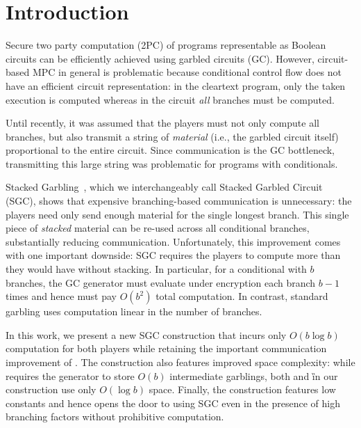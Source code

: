 \section{Introduction}\label{sec:intro}

Secure two party computation (2PC) of programs representable as Boolean circuits can be efficiently achieved using garbled circuits (GC).
%
However,  circuit-based MPC in general is problematic because conditional
control flow does not have an efficient circuit representation:
in the cleartext program, only the taken execution is computed whereas in
the circuit \emph{all} branches must be computed.

%
Until recently, it was assumed that the players must not only compute
all branches, but also transmit a string of \emph{material} (i.e., the garbled circuit itself) 
proportional to the entire circuit.  
Since communication is the GC bottleneck, transmitting this large string was
problematic for programs with conditionals.

Stacked Garbling~\HK, which we %
interchangeably call Stacked Garbled Circuit (SGC), shows that
expensive branching-based communication is unnecessary: the players need only
send enough material for the single longest branch. This single
piece of \emph{stacked} material can be re-used across all conditional branches,
substantially reducing communication.
%
Unfortunately, this improvement comes with one important downside:
SGC requires the players to compute more than they would have without stacking.
In particular, for a conditional with $b$ branches, the \HK GC
generator must evaluate under encryption each branch $b-1$ times and
hence must pay $O(b^2)$ total computation.
In contrast, standard garbling uses computation linear in the number
of branches.

In this work, we present a new SGC construction that incurs
only $O(b \log b)$ computation for both players while
retaining the important communication improvement of \HK.
%
The construction also features improved space complexity: while \HK
requires the generator to store $O(b)$ intermediate garblings, both \E and \G in our
construction use only $O(\log b)$ space.
%
Finally, the construction features low constants and hence opens the
door to using SGC even in the presence of high branching factors
without prohibitive computation.



